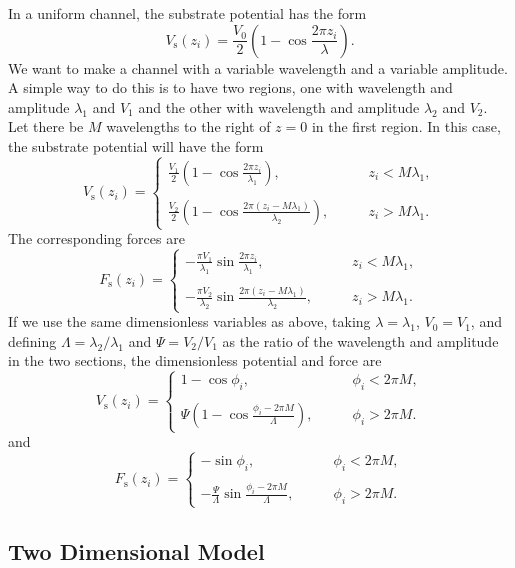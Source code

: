 \documentclass[11pt]{article}
\begin{document}
In a uniform channel, the substrate potential has the form
\[
V_\text{s}(z_i)=\frac{V_0}{2}\left(1-\cos\frac{2\pi z_i}{\lambda}\right).
\]
We want to make a channel with a variable wavelength and a variable amplitude. A simple way to do this is to have two regions, one with wavelength and amplitude $\lambda_1$ and $V_1$ and the other with wavelength and amplitude $\lambda_2$ and $V_2$. Let there be $M$ wavelengths to the right of $z=0$ in the first region. In this case, the substrate potential will have the form
\[
V_\text{s}(z_i)=\begin{cases}
	\displaystyle
	\frac{V_1}{2}\left(1-\cos\frac{2\pi z_i}{\lambda_1}\right),
		\quad&\quad
		z_i < M\lambda_1,\\\\
	\displaystyle
	\frac{V_2}{2}\left(1
		-\cos\frac{2\pi (z_i-M\lambda_1)}{\lambda_2}\right),
		\quad&\quad
		z_i > M\lambda_1.\end{cases}
\]
The corresponding forces are
\[
F_\text{s}(z_i)=\begin{cases}
	\displaystyle
	-\frac{\pi V_1}{\lambda_1}\sin\frac{2\pi z_i}{\lambda_1},
		\quad&\quad
		z_i < M\lambda_1,\\\\
	\displaystyle
	-\frac{\pi V_2}{\lambda_2}
		\sin\frac{2\pi (z_i-M\lambda_1)}{\lambda_2},
		\quad&\quad
		z_i > M\lambda_1.\end{cases}
\]
If we use the same dimensionless variables as above, taking $\lambda=\lambda_1$, $V_0=V_1$, and defining $\Lambda=\lambda_2/\lambda_1$ and $\Psi=V_2/V_1$ as the ratio of the wavelength and amplitude in the two sections, the dimensionless potential and force are
\[
V_\text{s}(z_i)=\begin{cases}
	\displaystyle 1-\cos\phi_i,
		\quad&\quad
		\phi_i < 2\pi M,\\\\
	\displaystyle \Psi\left(1 -\cos\frac{\phi_i-2\pi M}{\Lambda}\right),
		\quad&\quad
		\phi_i > 2\pi M.\end{cases}
\]
and
\[
F_\text{s}(z_i)=\begin{cases}
	\displaystyle
	-\sin\phi_i,
		\quad&\quad
		\phi_i < 2\pi M,\\\\
	\displaystyle
	-\frac{\Psi}{\Lambda}\sin\frac{\phi_i-2\pi M}{\Lambda},
		\quad&\quad
		\phi_i > 2\pi M.\end{cases}
\]


\subsection{Two Dimensional Model}
\end{document}
